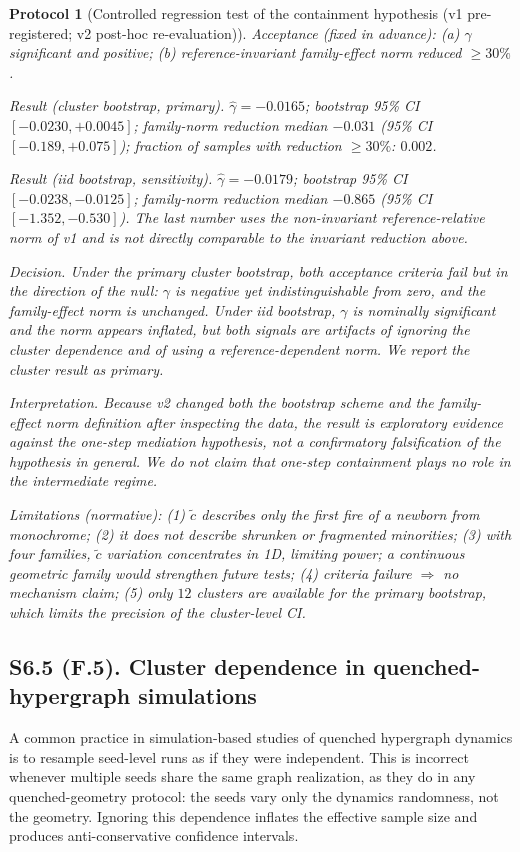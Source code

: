 \documentclass[preprint,12pt]{elsarticle}
\newtheorem{protocol}[theorem]{Protocol}
\newcommand{\ctil}{\tilde{c}}
\begin{document}
\begin{protocol}[Controlled regression test of the containment hypothesis
(v1 pre-registered; v2 post-hoc re-evaluation)]
\emph{Acceptance (fixed in advance):} (a) \(\gamma\) significant and
positive; (b) reference-invariant family-effect norm reduced
\(\ge 30\%\).

\emph{Result (cluster bootstrap, primary).} \(\hat\gamma=-0.0165\);
bootstrap 95\% CI \([-0.0230,+0.0045]\); family-norm reduction median
\(-0.031\) (95\% CI \([-0.189,+0.075]\)); fraction of samples with
reduction \(\ge 30\%\): \(0.002\).

\emph{Result (iid bootstrap, sensitivity).} \(\hat\gamma=-0.0179\);
bootstrap 95\% CI \([-0.0238,-0.0125]\); family-norm reduction median
\(-0.865\) (95\% CI \([-1.352,-0.530]\)). The last number uses the
non-invariant reference-relative norm of v1 and is not directly
comparable to the invariant reduction above.

\emph{Decision.} Under the primary cluster bootstrap, both acceptance
criteria fail but in the direction of the null: \(\gamma\) is negative
yet indistinguishable from zero, and the family-effect norm is
unchanged. Under iid bootstrap, \(\gamma\) is nominally significant
and the norm appears inflated, but both signals are artifacts of
ignoring the cluster dependence and of using a reference-dependent
norm. We report the cluster result as primary.

\emph{Interpretation.} Because v2 changed both the bootstrap scheme and
the family-effect norm definition after inspecting the data, the result
is exploratory evidence against the one-step mediation hypothesis, not
a confirmatory falsification of the hypothesis in general. We do not
claim that one-step containment plays no role in the intermediate
regime.

\emph{Limitations (normative):} (1) \(\ctil\) describes only the first
fire of a newborn from monochrome; (2) it does not describe shrunken or
fragmented minorities; (3) with four families, \(\ctil\) variation
concentrates in 1D, limiting power; a continuous geometric family would
strengthen future tests; (4) criteria failure \(\Rightarrow\) no
mechanism claim; (5) only \(12\) clusters are available for the primary
bootstrap, which limits the precision of the cluster-level CI.
\end{protocol}

\subsection*{S6.5 (F.5). Cluster dependence in quenched-hypergraph simulations}
\label{sec:cluster_note}

A common practice in simulation-based studies of quenched hypergraph
dynamics is to resample seed-level runs as if they were independent.
This is incorrect whenever multiple seeds share the same graph
realization, as they do in any quenched-geometry protocol: the seeds
vary only the dynamics randomness, not the geometry. Ignoring this
dependence inflates the effective sample size and produces
anti-conservative confidence intervals.
\end{document}
